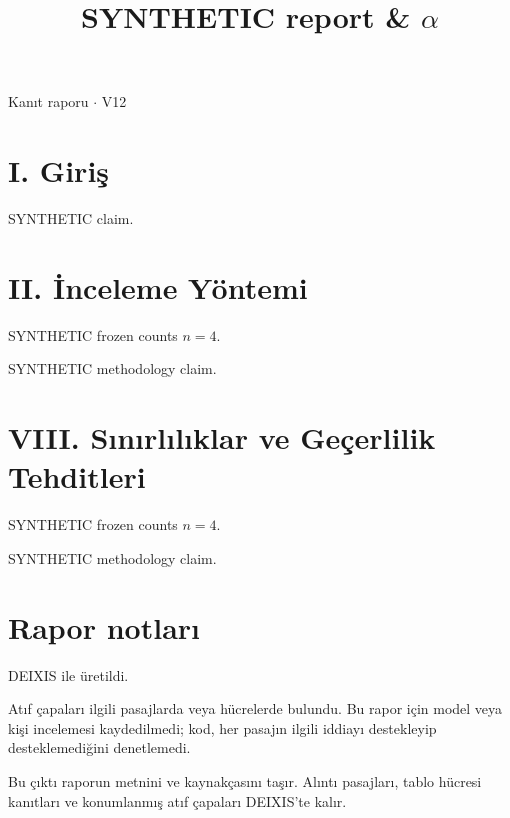 \documentclass[journal]{IEEEtran}
\begin{document}
\renewcommand{\abstractname}{Özet}
\renewcommand{\IEEEkeywordsname}{Dizin Terimleri}
\renewcommand{\refname}{Kaynaklar}

\title{SYNTHETIC report \& \ensuremath{\alpha}}

\maketitle

\noindent Kanıt raporu \ensuremath{\cdot} V12

\section*{I. Giriş}

SYNTHETIC claim. \cite{Synth26}

\section*{II. İnceleme Yöntemi}

SYNTHETIC frozen counts $n=4$.

SYNTHETIC methodology claim.

\section*{VIII. Sınırlılıklar ve Geçerlilik Tehditleri}

SYNTHETIC frozen counts $n=4$.

SYNTHETIC methodology claim.

\section*{Rapor notları}

DEIXIS ile üretildi.

Atıf çapaları ilgili pasajlarda veya hücrelerde bulundu. Bu rapor için model veya kişi incelemesi kaydedilmedi; kod, her pasajın ilgili iddiayı destekleyip desteklemediğini denetlemedi.

Bu çıktı raporun metnini ve kaynakçasını taşır. Alıntı pasajları, tablo hücresi kanıtları ve konumlanmış atıf çapaları DEIXIS'te kalır.




\end{document}
